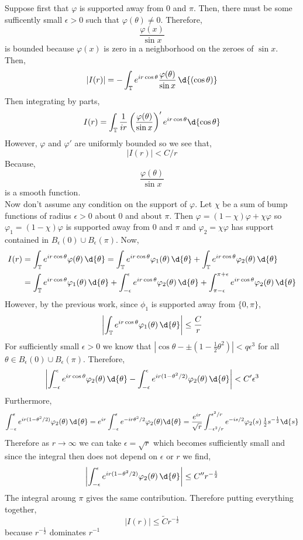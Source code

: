 \documentclass[12pt]{article}
\renewcommand{\T}{\mathbb{T}}
\begin{document}
Suppose first that $\varphi$ is supported away from $0$ and $\pi$. Then, there must be some sufficently small $\epsilon > 0$ such that $\varphi(\theta) \neq 0$. Therefore, 
\[ \frac{\varphi(x)}{\sin{x}} \]
is bounded because $\varphi(x)$ is zero in a neighborhood on the zeroes of $\sin{x}$. Then,
\[ |I(r)| =  - \int_\T e^{i r \cos{\theta}} \frac{\varphi(\theta)}{\sin{x}} \, \d{(\cos{\theta})}  \]
Then integrating by parts,
\[ I(r) = \int_{\T} \frac{1}{i r} \left( \frac{\varphi(\theta)}{\sin{x}} \right)' e^{ir \cos{\theta}} \d{\cos{\theta}} \]
However, $\varphi$ and $\varphi'$ are uniformly bounded so we see that,
\[ | I(r) | < C / r \]
Because,
\[ \frac{\varphi(\theta)}{\sin{x}} \]
is a smooth function. 
\bigskip\\
Now don't assume any condition on the support of $\varphi$. Let $\chi$ be a sum of bump functions of radius $\epsilon > 0$ about $0$ and about $\pi$. Then $\varphi = (1 - \chi) \varphi + \chi \varphi$ so $\varphi_1 = (1 - \chi) \varphi$ is supported away from $0$ and $\pi$ and $\varphi_2 = \chi \varphi$ has support contained in $B_\epsilon(0) \cup B_{\epsilon}(\pi)$. Now,
\begin{align*}
I(r) & = \int_{\T} e^{i r \cos{\theta}} \varphi(\theta) \, \d{\theta} = \int_{\T} e^{i r \cos{\theta}} \varphi_1(\theta) \, \d{\theta} + \int_{\T} e^{i r \cos{\theta}} \varphi_2(\theta) \, \d{\theta}
\\
& = \int_{\T} e^{i r \cos{\theta}} \varphi_1(\theta) \, \d{\theta} + \int_{-\epsilon}^{\epsilon} e^{i r \cos{\theta}} \varphi_2(\theta) \, \d{\theta} + \int_{\pi -\epsilon}^{\pi + \epsilon} e^{i r \cos{\theta}} \varphi_2(\theta) \, \d{\theta}
\end{align*}
However, by the previous work, since $\phi_1$ is supported away from $\{ 0, \pi \}$,
\[ \left| \int_{\T} e^{i r \cos{\theta}} \varphi_1(\theta) \, \d{\theta} \right| \le \frac{C}{r} \]
For sufficiently small $\epsilon > 0$ we know that $|\cos{\theta} - \pm (1 - \frac{1}{2} \theta^2)| < q \epsilon^3$ for all $\theta \in B_\epsilon(0) \cup B_{\epsilon}(\pi)$. Therefore,
\[ \left| \int_{-\epsilon}^{\epsilon} e^{i r \cos{\theta}} \varphi_2(\theta) \, \d{\theta} - \int_{-\epsilon}^{\epsilon} e^{i r (1 - \theta^2/2)} \varphi_2(\theta) \, \d{\theta} \right| < C' \epsilon^3 \]
Furthermore,
\[ \int_{-\epsilon}^{\epsilon} e^{i r (1 - \theta^2/2)} \varphi_2(\theta) \, \d{\theta} = e^{i r} \int_{-\epsilon}^{\epsilon} e^{- i r \theta^2/2} \varphi_2(\theta) \d{\theta} = \frac{e^{i r}}{\sqrt{r}} \int_{-\epsilon^2/r}^{\epsilon^2/r} e^{-i s / 2} \varphi_2(s) \, \tfrac{1}{2} s^{-\frac{1}{2}} \d{s} \]
Therefore as $r \to \infty$ we can take $\epsilon = \sqrt{r}$ which becomes sufficiently small and since the integral then does not depend on $\epsilon$ or $r$ we find,
\[ \left| \int_{-\epsilon}^{\epsilon} e^{i r (1 - \theta^2/2)} \varphi_2(\theta) \, \d{\theta} \right| \le C'' r^{-\frac{1}{2}} \]
The integral aroung $\pi$ gives the same contribution. Therefore putting everything together,
\[ |I(r)| \le \tilde{C} r^{-\frac{1}{2}} \]
because $r^{-\frac{1}{2}}$ dominates $r^{-1}$
\end{document}

